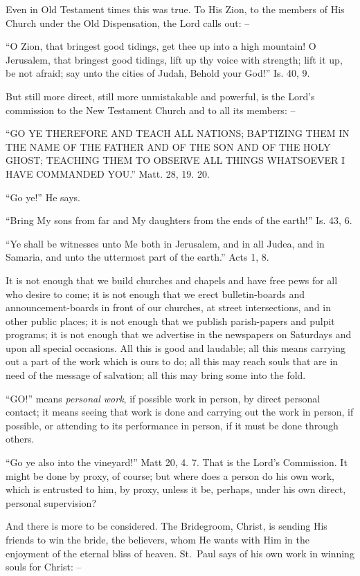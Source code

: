 \documentclass[
]{book}
\begin{document}
Even in Old Testament times this was true. To His Zion, to the members of His Church under the Old Dispensation, the Lord calls out: --

``O Zion, that bringest good tidings, get thee up into a high mountain! O Jerusalem, that bringest good tidings, lift up thy voice with strength; lift it up, be not afraid; say unto the cities of Judah, Behold your God!'' Is. 40, 9.

But still more direct, still more unmistakable and powerful, is the Lord's commission to the New Testament Church and to all its members: --

``GO YE THEREFORE AND TEACH ALL NATIONS; BAPTIZING THEM IN THE NAME OF THE FATHER AND OF THE SON AND OF THE HOLY GHOST; TEACHING THEM TO OBSERVE ALL THINGS WHATSOEVER I HAVE COMMANDED YOU.'' Matt. 28, 19. 20.

``Go ye!'' He says.

``Bring My sons from far and My daughters from the ends of the earth!'' Is. 43, 6.

``Ye shall be witnesses unto Me both in Jerusalem, and in all Judea, and in Samaria, and unto the uttermost part of the earth.'' Acts 1, 8.

It is not enough that we build churches and chapels and have free pews for all who desire to come; it is not enough that we erect bulletin-boards and announcement-boards in front of our churches, at street intersections, and in other public places; it is not enough that we publish parish-papers and pulpit programs; it is not enough that we advertise in the newspapers on Saturdays and upon all special occasions. All this is good and laudable; all this means carrying out a part of the work which is ours to do; all this may reach souls that are in need of the message of salvation; all this may bring some into the fold.

``GO!'' means \emph{personal work}, if possible work in person, by direct personal contact; it means seeing that work is done and carrying out the work in person, if possible, or attending to its performance in person, if it must be done through others.

``Go ye also into the vineyard!'' Matt 20, 4. 7. That is the Lord's Commission. It might be done by proxy, of course; but where does a person do his own work, which is entrusted to him, by proxy, unless it be, perhaps, under his own direct, personal supervision?

And there is more to be considered. The Bridegroom, Christ, is sending His friends to win the bride, the believers, whom He wants with Him in the enjoyment of the eternal bliss of heaven. St.~Paul says of his own work in winning souls for Christ: --
\end{document}
